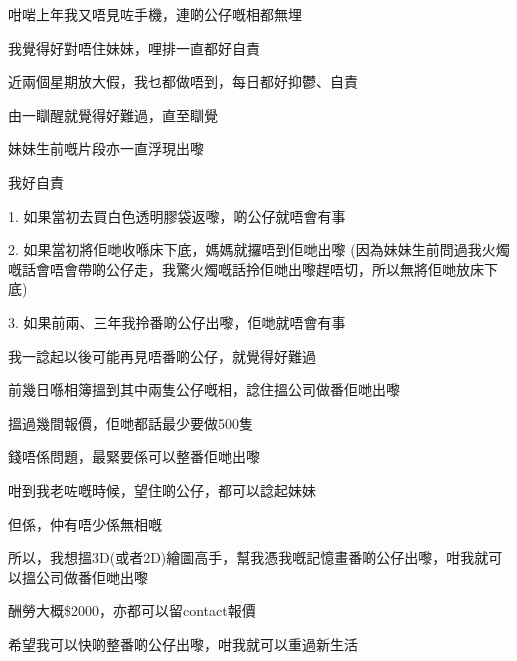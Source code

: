咁啱上年我又唔見咗手機，連啲公仔嘅相都無埋

我覺得好對唔住妹妹，哩排一直都好自責

近兩個星期放大假，我乜都做唔到，每日都好抑鬱、自責

由一瞓醒就覺得好難過，直至瞓覺

妹妹生前嘅片段亦一直浮現出嚟

我好自責

1. 如果當初去買白色透明膠袋返嚟，啲公仔就唔會有事

2. 如果當初將佢哋收喺床下底，媽媽就攞唔到佢哋出嚟 (因為妹妹生前問過我火燭嘅話會唔會帶啲公仔走，我驚火燭嘅話拎佢哋出嚟趕唔切，所以無將佢哋放床下底)

3. 如果前兩、三年我拎番啲公仔出嚟，佢哋就唔會有事

我一諗起以後可能再見唔番啲公仔，就覺得好難過

前幾日喺相簿搵到其中兩隻公仔嘅相，諗住搵公司做番佢哋出嚟

搵過幾間報價，佢哋都話最少要做500隻

錢唔係問題，最緊要係可以整番佢哋出嚟

咁到我老咗嘅時候，望住啲公仔，都可以諗起妹妹

但係，仲有唔少係無相嘅

所以，我想搵3D(或者2D)繪圖高手，幫我憑我嘅記憶畫番啲公仔出嚟，咁我就可以搵公司做番佢哋出嚟

酬勞大概\$2000，亦都可以留contact報價

希望我可以快啲整番啲公仔出嚟，咁我就可以重過新生活

